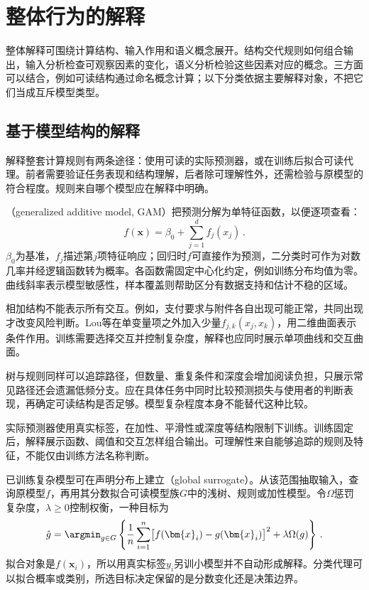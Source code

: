 \section{整体行为的解释}
\label{sec:interpretability-global}

整体解释可围绕计算结构、输入作用和语义概念展开。结构交代规则如何组合输出，输入分析检查可观察因素的变化，语义分析检验这些因素对应的概念。三方面可以结合，例如可读结构通过命名概念计算；以下分类依据主要解释对象，不把它们当成互斥模型类型。

\subsection{基于模型结构的解释}
\label{sec:interpretability-global-response}

解释整套计算规则有两条途径：使用可读的实际预测器，或在训练后拟合可读代理。前者需要验证任务表现和结构理解，后者除可理解性外，还需检验与原模型的符合程度。规则来自哪个模型应在解释中明确。

（generalized additive model, GAM）把预测分解为单特征函数，以便逐项查看：
\begin{equation}
 f(\bm{x})=\beta_0+\sum_{j=1}^{d}f_j(x_j)\, .
 \label{eq:interpretability-gam}
\end{equation}
$\beta_0$为基准，$f_j$描述第$j$项特征响应；回归时$f$可直接作为预测，二分类时可作为对数几率并经逻辑函数转为概率。各函数需固定中心化约定，例如训练分布均值为零。曲线斜率表示模型敏感性，样本覆盖则帮助区分有数据支持和估计不稳的区域。

相加结构不能表示所有交互。例如，支付要求与附件各自出现可能正常，共同出现才改变风险判断。Lou等在单变量项之外加入少量$f_{j,k}(x_j,x_k)$，用二维曲面表示条件作用。训练需要选择交互并控制复杂度，解释也应同时展示单项曲线和交互曲面。

树与规则同样可以追踪路径，但数量、重复条件和深度会增加阅读负担，只展示常见路径还会遗漏低频分支。应在具体任务中同时比较预测损失与使用者的判断表现，再确定可读结构是否足够。模型复杂程度本身不能替代这种比较。

实际预测器使用真实标签，在加性、平滑性或深度等结构限制下训练。训练固定后，解释展示函数、阈值和交互怎样组合输出。可理解性来自能够追踪的规则及特征，不能仅由训练方法名称判断。

已训练复杂模型可在声明分布上建立（global surrogate）。从该范围抽取输入，查询原模型$f$，再用其分数拟合可读模型族$G$中的浅树、规则或加性模型。令$\Omega$惩罚复杂度，$\lambda\geq0$控制权衡，一种目标为
\begin{equation}
 \hat g=\argmin_{g\in G}\left\{
 \frac1n\sum_{i=1}^n\bigl[f(\bm{x}_i)-g(\bm{x}_i)\bigr]^2
 +\lambda\Omega(g)\right\}\, .
 \label{eq:interpretability-global-surrogate}
\end{equation}
拟合对象是$f(\bm x_i)$，所以用真实标签$y_i$另训小模型并不自动形成解释。分类代理可以拟合概率或类别，所选目标决定保留的是分数变化还是决策边界。

